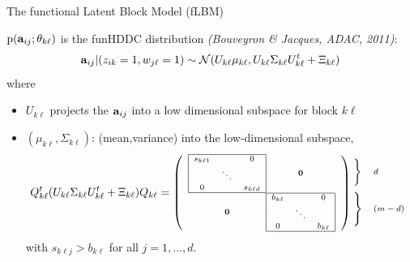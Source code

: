 \documentclass[10pt]{beamer}
\newcommand{\pdf}{\mbox{p}}
\newcommand{\ba}{\bold{a}}
\begin{document}
\begin{frame}{The functional Latent Block Model (fLBM)}
\begin{small}$\pdf(\ba_{ij};\theta_{k\ell})$ is the funHDDC distribution \textit{(Bouveyron \& Jacques, ADAC, 2011)}:
$$\ba_{ij}|(z_{ik}=1,w_{j\ell}=1)\sim\mathcal{N}(U_{k\ell}\mu_{k\ell},U_{k\ell}\Sigma_{k\ell}U_{k\ell}^t+\Xi_{k\ell})$$
where
\begin{itemize}
\item $U_{k\ell}$ projects the $\ba_{ij}$ into a low dimensional subspace for block $k\ell$
\item $(\mu_{k\ell},\Sigma_{k\ell})$: (mean,variance) into the low-dimensional subspace,
\begin{eqnarray*}
\scriptsize{Q_{k\ell}^t (U_{k\ell}\Sigma_{k\ell}U_{k\ell}^t+\Xi_{k\ell}) Q_{k\ell}=\left(\begin{array}{c@{}c}
\begin{array}{|ccc|}
\hline s_{k\ell1} &  & 0\\
 & \ddots & \\
0 &  & s_{k\ell d}\\\hline \end{array} & \mathbf{0}\\
\mathbf{0} & \begin{array}{|ccc|}
\hline b_{k\ell} &  &  0\\
 &  \ddots & \\
0 &   & b_{k\ell}\\\hline \end{array}\end{array}\right)\hspace{-.6cm}\begin{array}{ll}
\left.\begin{array}{l}
\,\\
\,\\
\,\end{array}\right\}  & d\vspace{1.5ex}\\
\left.\begin{array}{l}
\,\\
\,\\
\,\\
\,\end{array}\right\}  & (m-d)\end{array}\label{eqdelta}}
\end{eqnarray*}
with $s_{k\ell j}>b_{k\ell}$ for all $j=1,...,d$. 
\end{itemize}
\end{small}
\end{frame}
\end{document}
